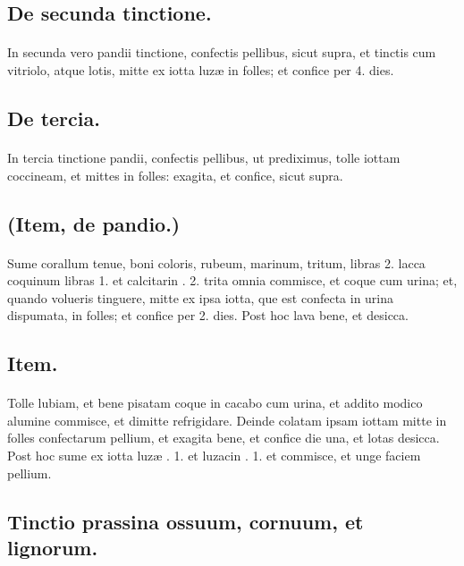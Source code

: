 \documentclass[a4paper, 11pt, oneside, polutonikogreek, italian]{article}
\begin{document}
\subsection{De secunda tinctione.}
\paragraph{}
In secunda vero pandii tinctione, confectis pellibus, sicut supra, et tinctis cum vitriolo, atque lotis, mitte ex iotta luzæ in folles; et confice per 4. dies.

\subsection{De tercia.}
\paragraph{}
In tercia tinctione pandii, confectis pellibus, ut prediximus, tolle iottam coccineam, et mittes in folles: exagita, et confice, sicut supra.

\subsection{(Item, de pandio.)}
\paragraph{}
Sume corallum tenue, boni coloris, rubeum, marinum, tritum, libras 2. lacca coquinum libras 1. et calcitarin \roundz. 2. trita omnia commisce, et coque cum urina; et, quando volueris tinguere, mitte ex ipsa iotta, que est confecta in urina dispumata, in folles; et confice per 2. dies. Post hoc lava bene, et desicca.

\subsection{Item.}
\paragraph{}
Tolle lubiam, et bene pisatam coque in cacabo cum urina, et addito modico alumine commisce, et dimitte refrigidare. Deinde colatam ipsam iottam mitte in folles confectarum pellium, et exagita bene, et confice die una, et lotas desicca. Post hoc sume ex iotta luzæ \roundz. 1. et luzacin \roundz. 1. et commisce, et unge faciem pellium.

\subsection{Tinctio prassina ossuum, cornuum, et lignorum.}
\end{document}
